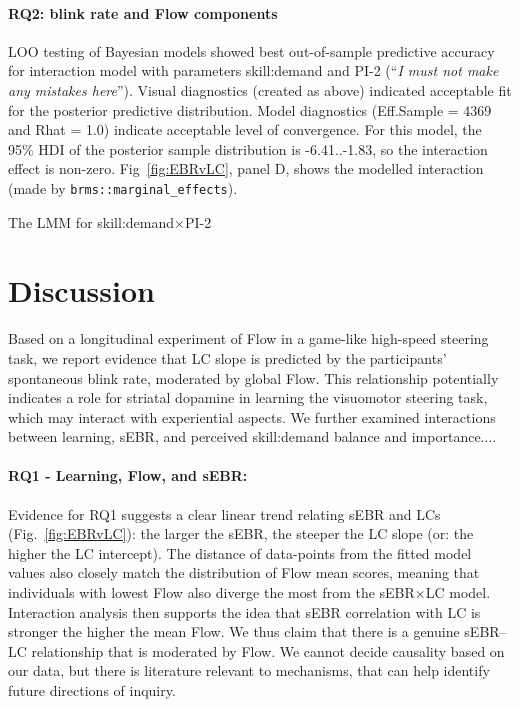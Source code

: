\documentclass[10pt,letterpaper,floatsintext]{article}
\begin{document}
%

\paragraph{RQ2: blink rate and Flow components}
LOO testing of Bayesian models showed best out-of-sample predictive accuracy for interaction model with parameters skill:demand and PI-2 (``\textit{I must not make any mistakes here}''). 
Visual diagnostics (created as above) indicated acceptable fit for the posterior predictive distribution. Model diagnostics (Eff.Sample = 4369 and Rhat = 1.0) indicate acceptable level of convergence. For this model, the 95\% HDI of the posterior sample distribution is -6.41..-1.83, so the interaction effect is non-zero. Fig~\ref{fig:EBRvLC}, panel D, shows the modelled interaction (made by \verb|brms::marginal_effects|).

The LMM for skill:demand$\times$PI-2

\section{Discussion}
Based on a longitudinal experiment of Flow in a game-like high-speed steering task, we report evidence that LC slope is predicted by the participants' spontaneous blink rate, moderated by global Flow. This relationship potentially indicates a role for striatal dopamine in learning the visuomotor steering task, which may interact with experiential aspects. We further examined interactions between learning, sEBR, and perceived skill:demand balance and importance....%


\paragraph{RQ1 - Learning, Flow, and sEBR:}
Evidence for RQ1 suggests a clear linear trend relating sEBR and LCs (Fig.~\ref{fig:EBRvLC}): the larger the sEBR, the steeper the LC slope (or: the higher the LC intercept). The distance of data-points from the fitted model values also closely match the distribution of Flow mean scores, meaning that individuals with lowest Flow also diverge the most from the sEBR$\times$LC model. Interaction analysis then supports the idea that sEBR correlation with LC is stronger the higher the mean Flow. We thus claim that there is a genuine sEBR--LC relationship that is moderated by Flow. We cannot decide causality based on our data, but there is literature relevant to mechanisms, that can help identify future directions of inquiry.
\end{document}
